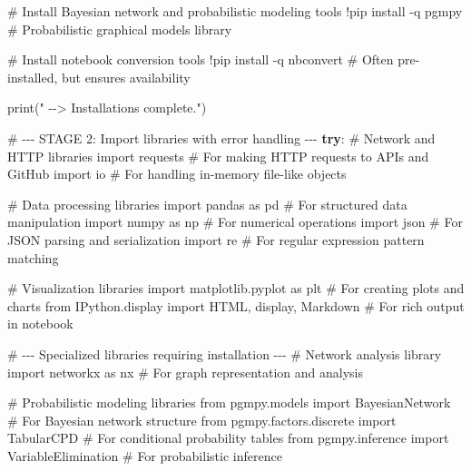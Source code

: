 \documentclass[
  11pt,
  letterpaper,
]{book}
\newenvironment{Shaded}{\begin{snugshade}}{\end{snugshade}}
\newcommand{\BuiltInTok}[1]{\textcolor[rgb]{0.00,0.23,0.31}{#1}}
\newcommand{\CommentTok}[1]{\textcolor[rgb]{0.37,0.37,0.37}{#1}}
\newcommand{\ControlFlowTok}[1]{\textcolor[rgb]{0.00,0.23,0.31}{\textbf{#1}}}
\newcommand{\ImportTok}[1]{\textcolor[rgb]{0.00,0.46,0.62}{#1}}
\newcommand{\NormalTok}[1]{\textcolor[rgb]{0.00,0.23,0.31}{#1}}
\newcommand{\OperatorTok}[1]{\textcolor[rgb]{0.37,0.37,0.37}{#1}}
\newcommand{\StringTok}[1]{\textcolor[rgb]{0.13,0.47,0.30}{#1}}
\begin{document}
\begin{Shaded}
\begin{Highlighting}[]
    \CommentTok{\# Install Bayesian network and probabilistic modeling tools}
    \OperatorTok{!}\NormalTok{pip install }\OperatorTok{{-}}\NormalTok{q pgmpy  }\CommentTok{\# Probabilistic graphical models library}

    \CommentTok{\# Install notebook conversion tools}
    \OperatorTok{!}\NormalTok{pip install }\OperatorTok{{-}}\NormalTok{q nbconvert  }\CommentTok{\# Often pre{-}installed, but ensures availability}

    \BuiltInTok{print}\NormalTok{(}\StringTok{"   {-}{-}\textgreater{} Installations complete."}\NormalTok{)}

    \CommentTok{\# {-}{-}{-} STAGE 2: Import libraries with error handling {-}{-}{-}}
    \ControlFlowTok{try}\NormalTok{:}
        \CommentTok{\# Network and HTTP libraries}
        \ImportTok{import}\NormalTok{ requests      }\CommentTok{\# For making HTTP requests to APIs and GitHub}
        \ImportTok{import}\NormalTok{ io            }\CommentTok{\# For handling in{-}memory file{-}like objects}

        \CommentTok{\# Data processing libraries}
        \ImportTok{import}\NormalTok{ pandas }\ImportTok{as}\NormalTok{ pd  }\CommentTok{\# For structured data manipulation}
        \ImportTok{import}\NormalTok{ numpy }\ImportTok{as}\NormalTok{ np   }\CommentTok{\# For numerical operations}
        \ImportTok{import}\NormalTok{ json          }\CommentTok{\# For JSON parsing and serialization}
        \ImportTok{import}\NormalTok{ re            }\CommentTok{\# For regular expression pattern matching}

        \CommentTok{\# Visualization libraries}
        \ImportTok{import}\NormalTok{ matplotlib.pyplot }\ImportTok{as}\NormalTok{ plt  }\CommentTok{\# For creating plots and charts}
        \ImportTok{from}\NormalTok{ IPython.display }\ImportTok{import}\NormalTok{ HTML, display, Markdown  }\CommentTok{\# For rich output in notebook}

        \CommentTok{\# {-}{-}{-} Specialized libraries requiring installation {-}{-}{-}}
        \CommentTok{\# Network analysis library}
        \ImportTok{import}\NormalTok{ networkx }\ImportTok{as}\NormalTok{ nx  }\CommentTok{\# For graph representation and analysis}

        \CommentTok{\# Probabilistic modeling libraries}
        \ImportTok{from}\NormalTok{ pgmpy.models }\ImportTok{import}\NormalTok{ BayesianNetwork  }\CommentTok{\# For Bayesian network structure}
        \ImportTok{from}\NormalTok{ pgmpy.factors.discrete }\ImportTok{import}\NormalTok{ TabularCPD  }\CommentTok{\# For conditional probability tables}
        \ImportTok{from}\NormalTok{ pgmpy.inference }\ImportTok{import}\NormalTok{ VariableElimination  }\CommentTok{\# For probabilistic inference}


\end{Highlighting}
\end{Shaded}
\end{document}
